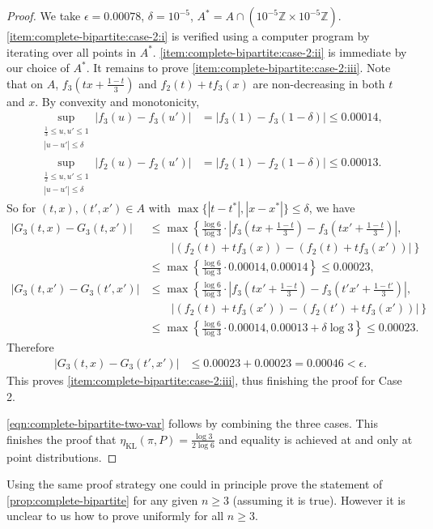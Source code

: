 \documentclass[11pt]{article}
\def\bZ{\mathbb{Z}}
\DeclareMathOperator\KL{\mathrm{KL}}
\theoremstyle{definition}
\begin{document}
\begin{proof}
  We take $\epsilon=0.00078$, $\delta=10^{-5}$, $A^* = A \cap \left(10^{-5} \bZ \times 10^{-5} \bZ\right)$.
  \cref{item:complete-bipartite:case-2:i} is verified using a computer program by iterating over all points in $A^*$.
  \cref{item:complete-bipartite:case-2:ii} is immediate by our choice of $A^*$.
  It remains to prove \cref{item:complete-bipartite:case-2:iii}.
  Note that on $A$, $f_3\left(t x+\frac{1-t}{3}\right)$ and $f_2(t) + t f_3(x)$ are non-decreasing in both $t$ and $x$.
  By convexity and monotonicity,
  \begin{align}
    \sup_{\substack{\frac 13 \le u,u'\le 1 \\ |u-u'|\le \delta}} |f_3(u)-f_3(u')| &= |f_3(1)-f_3(1-\delta)| \le 0.00014,\\
    \sup_{\substack{\frac 12\le u,u'\le 1 \\ |u-u'|\le \delta}} |f_2(u)-f_2(u')| &= |f_2(1)-f_2(1-\delta)| \le 0.00013.
  \end{align}
  So for $(t,x),(t',x')\in A$ with $\max\{|t-t^*|,|x-x^*|\}\le \delta$, we have
  \begin{align}
    |G_3(t,x)-G_3(t,x')| &\le
    \max\left\{ \frac{\log 6}{\log 3} \cdot \left| f_3\left(t x+\frac{1-t}{3}\right) -f_3\left(t x'+\frac{1-t}{3}\right) \right|,\right. \\
    \nonumber &\qquad \left.\left|(f_2(t) + t f_3(x))-(f_2(t) + t f_3(x'))\right|\right\} \\
    \nonumber &\le \max\left\{ \frac{\log 6}{\log 3} \cdot 0.00014, 0.00014\right\} \le 0.00023,\\
    |G_3(t,x')-G_3(t',x')| &\le
    \max\left\{ \frac{\log 6}{\log 3} \cdot \left| f_3\left(t x'+\frac{1-t}{3}\right) -f_3\left(t' x'+\frac{1-t'}{3}\right) \right|,\right. \\
    \nonumber &\qquad \left.\left|(f_2(t) + t f_3(x'))-(f_2(t') + t f_3(x'))\right|\right\} \\
    \nonumber &\le \max\left\{ \frac{\log 6}{\log 3} \cdot 0.00014, 0.00013 + \delta \log 3 \right\} \le 0.00023.
  \end{align}
  Therefore
  \begin{align}
    |G_3(t,x)-G_3(t',x')| &\le 0.00023 + 0.00023 = 0.00046 < \epsilon.
  \end{align}
  This proves \cref{item:complete-bipartite:case-2:iii}, thus finishing the proof for Case 2.

  \cref{eqn:complete-bipartite-two-var} follows by combining the three cases. This finishes the proof that $\eta_{\KL}(\pi,P)=\frac{\log 3}{2\log 6}$ and equality is achieved at and only at point distributions.
\end{proof}
Using the same proof strategy one could in principle prove the statement of \cref{prop:complete-bipartite} for any given $n\ge 3$ (assuming it is true). However it is unclear to us how to prove uniformly for all $n\ge 3$.
\end{document}
